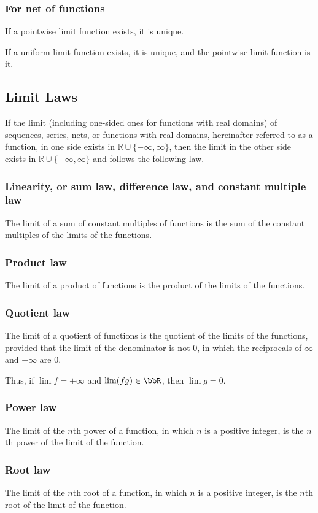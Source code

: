 \subsubsection{For net of functions}
\bit
\item If a pointwise limit function exists, it is unique.
\item If a uniform limit function exists, it is unique, and the pointwise limit function is it.
\eit
\subsection{Limit Laws}
If the limit (including one-sided ones for functions with real domains) of sequences, series, nets, or functions with real domains, hereinafter referred to as a function, in one side exists in $\mathbb{R}\cup\{-\infty,\infty\}$, then the limit in the other side exists in $\mathbb{R}\cup\{-\infty,\infty\}$ and follows the following law.
\subsubsection{Linearity, or sum law, difference law, and constant multiple law}
The limit of a sum of constant multiples of functions is the sum of the constant multiples of the limits of the functions.
\subsubsection{Product law}
The limit of a product of functions is the product of the limits of the functions.
\subsubsection{Quotient law}
The limit of a quotient of functions is the quotient of the limits of the functions, provided that the limit of the denominator is not 0, in which the reciprocals of $\infty$ and $-\infty$ are $0$.

Thus, if $\lim f=\pm\infty$ and $\lim(fg)\in\bbR$, then $\lim g=0$.
\subsubsection{Power law}
The limit of the $n$th power of a function, in which $n$ is a positive integer, is the $n$th power of the limit of the function.
\subsubsection{Root law}
The limit of the $n$th root of a function, in which $n$ is a positive integer, is the $n$th root of the limit of the function.
